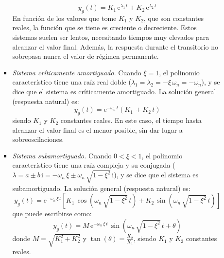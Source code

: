 \begin{enumerate}
\begin{itemize}
\begin{itemize}
\begin{equation*}
        y_g(t)=K_1\,\mathrm{e}^{\lambda_1\,t}+K_2\,\mathrm{e}^{\lambda_2\,t}   
      \end{equation*}
      En función de los valores que tome $K_1$ y $K_2$, que son
      constantes reales, la función que se tiene es creciente o
      decreciente. Estos sistemas suelen ser lentos, necesitando
      tiempos muy elevados para alcanzar el valor final. Además, la
      respuesta durante el transitorio no sobrepasa nunca el valor de
      régimen permanente.
    \item \textit{Sistema críticamente amortiguado.} Cuando $\xi=1$,
      el polinomio característico tiene {una raíz real doble}
      ($\lambda_1=\lambda_2=-\xi\,\omega_n=-\omega_n$), y se dice que
      el sistema es {críticamente amortiguado}. La solución general
      (respuesta natural) es:
      \begin{equation*}
        y_g(t)=\mathrm{e}^{-\omega_n\,t}(K_1\,+K_2\,t)   
      \end{equation*}
      siendo $K_1$ y $K_2$ constantes reales. En este caso, el tiempo
      hasta alcanzar el valor final es el menor posible, sin dar lugar
      a sobreoscilaciones.
    \item \textit{Sistema subamortiguado.} Cuando $0<\xi<1$, el
      polinomio característico tiene {una raíz compleja y su
        conjugada}
      ($\lambda=a\pm b\,\mathrm{i}=-\omega_n\,\xi\pm
      \omega_n\,\sqrt{1-\xi^2}\,\mathrm{i}$), y se dice que el sistema
      es {subamortiguado}. La solución general (respuesta natural) es:
      \begin{equation*}
        y_g(t)=\mathrm{e}^{-\omega_n\,\xi \,t}\left[K_1\,\cos(\omega_n\,\sqrt{1-\xi^2}\,t)+K_2\,\sin(\omega_n\,\sqrt{1-\xi^2}\,t) \right]  
      \end{equation*}
      que puede escribirse como:
      \begin{equation*}
        y_g(t)=M\,\mathrm{e}^{-\omega_n\,\xi \,t}\,\sin\left(\omega_n\,\sqrt{1-\xi^2}\,t + \theta \right)
      \end{equation*}
      donde $M=\sqrt{K_1^2+K_2^2}$ y $\tan(\theta)=\frac{K_2}{K_1}$,
      siendo $K_1$ y $K_2$ constantes reales.
    \end{itemize}

\end{itemize}
\end{enumerate}
